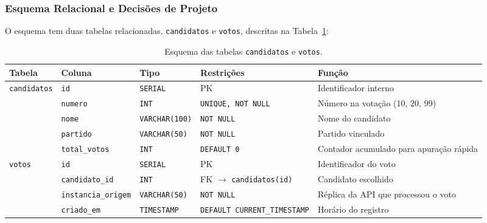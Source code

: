 \documentclass[12pt,a4paper]{article}
\begin{document}
\subsubsection{Esquema Relacional e Decisões de Projeto}
O esquema tem duas tabelas relacionadas, \texttt{candidatos} e \texttt{votos}, descritas na Tabela~\ref{tab:schema_db}:
\begin{table}[h!]
\centering
\footnotesize
\renewcommand{\arraystretch}{1.2}
\begin{tabularx}{\textwidth}{
  >{\raggedright\arraybackslash}p{}
  >{\raggedright\arraybackslash}p{}
  >{\raggedright\arraybackslash}p{}
  >{\raggedright\arraybackslash}p{}
  >{\raggedright\arraybackslash}X}
\toprule
\textbf{Tabela} & \textbf{Coluna} & \textbf{Tipo} & \textbf{Restrições} & \textbf{Função} \\
\midrule
\texttt{candidatos} & \texttt{id} & \texttt{SERIAL} & PK & Identificador interno \\
 & \texttt{numero} & \texttt{INT} & \texttt{UNIQUE, NOT NULL} & Número na votação (10, 20, 99) \\
 & \texttt{nome} & \texttt{VARCHAR(100)} & \texttt{NOT NULL} & Nome do candidato \\
 & \texttt{partido} & \texttt{VARCHAR(50)} & \texttt{NOT NULL} & Partido vinculado \\
 & \texttt{total\_votos} & \texttt{INT} & \texttt{DEFAULT 0} & Contador acumulado para apuração rápida \\
\midrule
\texttt{votos} & \texttt{id} & \texttt{SERIAL} & PK & Identificador do voto \\
 & \texttt{candidato\_id} & \texttt{INT} & FK $\rightarrow$ \texttt{candidatos(id)} & Candidato escolhido \\
 & \texttt{instancia\_origem} & \texttt{VARCHAR(50)} & \texttt{NOT NULL} & Réplica da API que processou o voto \\
 & \texttt{criado\_em} & \texttt{TIMESTAMP} & \texttt{DEFAULT CURRENT\_TIMESTAMP} & Horário do registro \\
\bottomrule
\end{tabularx}
\caption{Esquema das tabelas \texttt{candidatos} e \texttt{votos}.}
\label{tab:schema_db}
\end{table}
\end{document}
